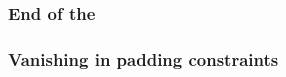 \subsubsection{End of the \cfi{}}                                                               \label{rom: generalities: end of cfi}                   
\subsubsection{Vanishing in padding constraints}                                                \label{rom: generalities: vanishing in padding}         

